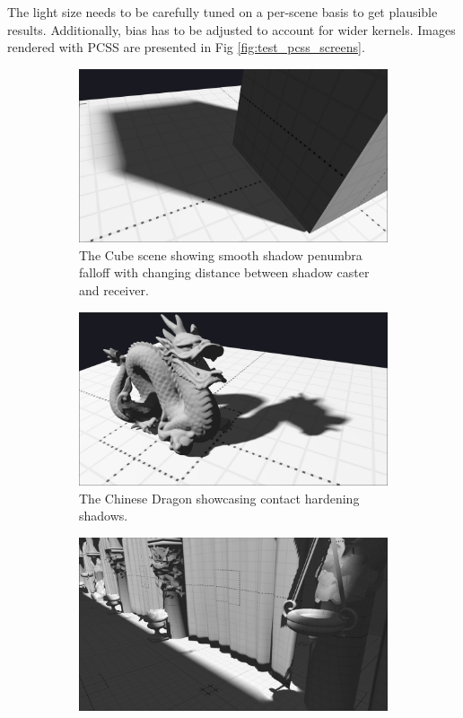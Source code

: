 The light size needs to be carefully tuned on a per-scene basis to get plausible results. Additionally, bias has to be adjusted to account for wider kernels. Images rendered with PCSS are presented in Fig \ref{fig:test_pcss_screens}.
\begin{figure}[h]
    \centering
    \begin{subfigure}[t]{0.49\textwidth}
		\centering
        \includegraphics[width=\textwidth]{./graf/tests/pcss/cropped/cube_pcss_1.png}
        \caption{The Cube scene showing smooth shadow penumbra falloff with changing distance between shadow caster and receiver.}
    \end{subfigure}
	\hfill
    \begin{subfigure}[t]{0.49\textwidth}
		\centering
        \includegraphics[width=\textwidth]{./graf/tests/pcss/cropped/dragon_pcss_1.png}
        \caption{The Chinese Dragon showcasing contact hardening shadows.}
    \end{subfigure}
    \begin{subfigure}[t]{0.49\textwidth}
		\centering
        \includegraphics[width=\textwidth]{./graf/tests/pcss/cropped/sponza_pcss_1.png}

\end{subfigure}
\end{figure}
